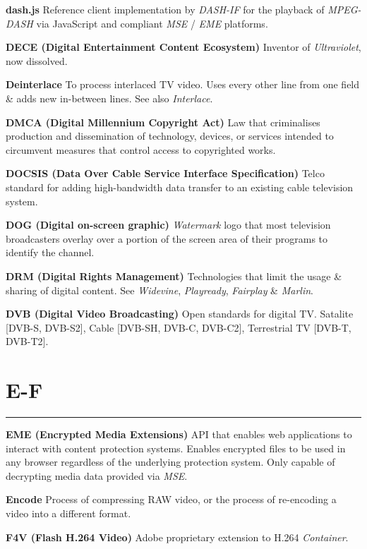 \smallskip
\textbf{dash.js}
Reference client implementation by \textit{DASH-IF} for the playback of \textit{MPEG-DASH} via JavaScript and compliant \textit{MSE} / \textit{EME} platforms.

\smallskip
\textbf{DECE (Digital Entertainment Content Ecosystem)}
Inventor of \textit{Ultraviolet}, now dissolved.

\smallskip
\textbf{Deinterlace}
To process interlaced TV video. Uses every other line from one field \& adds new in-between lines. See also \textit{Interlace}.

\smallskip
\textbf{DMCA (Digital Millennium Copyright Act)}
Law that criminalises production and dissemination of technology, devices, or services intended to circumvent measures that control access to copyrighted works.

\smallskip
\textbf{DOCSIS (Data Over Cable Service Interface Specification)}
Telco standard for adding high-bandwidth data transfer to an existing cable television system.

\smallskip
\textbf{DOG (Digital on-screen graphic)}
\textit{Watermark} logo that most television broadcasters overlay over a portion of the screen area of their programs to identify the channel.

\smallskip
\textbf{DRM (Digital Rights Management)}
Technologies that limit the usage \& sharing of digital content.  See \textit{Widevine}, \textit{Playready}, \textit{Fairplay} \& \textit{Marlin}.

\smallskip
\textbf{DVB (Digital Video Broadcasting)}
Open standards for digital TV.  Satalite [DVB-S, DVB-S2], Cable [DVB-SH, DVB-C, DVB-C2], Terrestrial TV [DVB-T, DVB-T2].


\section{E-F}
\hrule

\medskip
\textbf{EME (Encrypted Media Extensions)}
API that enables web applications to interact with content protection systems. Enables encrypted files to be used in any browser regardless of the underlying protection system. Only capable of decrypting media data provided via \textit{MSE}.

\smallskip
\textbf{Encode}
Process of compressing RAW video, or the process of re-encoding a video into a different format.

\smallskip
\textbf{F4V (Flash H.264 Video)}
Adobe proprietary extension to H.264 \textit{Container}.

